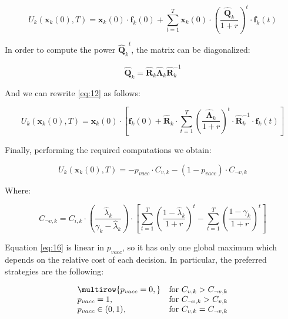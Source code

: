 \documentclass[11pt]{article}
\begin{document}
\begin{equation}\label{eq:12}
	U_k(\mathbf{x}_k(0), T)= \mathbf{x}_k(0) \cdot \mathbf{f}_k(0) + \sum_{t=1}^{T} {\mathbf{x}_k(0) \cdot \left(\frac{ \hat{\mathbf{Q}}_k}{1+r}\right)^t \cdot \mathbf{f}_k(t)}
\end{equation}

In order to compute the power \({\hat{\mathbf{Q}}_k}^t\), the matrix can be diagonalized:

\begin{equation}\label{eq:13}
	\hat{\mathbf{Q}}_k=\hat{\mathbf{R}}_{k}\hat{\mathbf{\Lambda}}_{k}\hat{\mathbf{R}}^{-1}_{k}
\end{equation}

And we can rewrite \eqref{eq:12} as follows:

\begin{equation}\label{eq:14}
	U_k(\mathbf{x}_k(0), T)= \mathbf{x}_k(0) \cdot \left[ \mathbf{f}_k(0) + \hat{\mathbf{R}}_{k} \cdot \sum_{t=1}^{T} { \left(\frac{ \hat{\mathbf{\Lambda}}_{k}}{1+r}\right)^t \cdot \hat{\mathbf{R}}^{-1}_{k} \cdot \mathbf{f}_k(t)} \right]
\end{equation}

Finally, performing the required computations we obtain: 

\begin{equation}\label{eq:15}
	U_k(\mathbf{x}_k(0), T)=-p_{vacc} \cdot C_{v,k} - (1-p_{vacc}) \cdot C_{\neg v,k}
\end{equation}

Where: 

\begin{equation}\label{eq:16}
	C_{\neg v,k}=C_{i,k} \cdot \left( \frac{\hat{\lambda}_{k}}{\gamma_{k}-\hat{\lambda}_{k}} \right) \cdot \left[\sum_{t = 1}^{T} \left(\frac{1-\hat{\lambda}_{k}}{1+r}\right)^t - \sum_{t = 1}^{T}\left(\frac{1-\gamma_k}{1+r}\right)^t\right]
\end{equation}

Equation \eqref{eq:16} is linear in \(p_{vacc}\), so it has only one global maximum which depends on the relative cost of each decision. In particular, the preferred strategies are the following:

\begin{equation}
	\begin{array}
	{@{}lr@{}}
        \multirow{p_{vacc}=0,} & \text{for }C_{v,k}>C_{\neg v,k} \\
        {p_{vacc}=1,} & \text{for }C_{\neg v,k}>C_{v,k} \\
        {p_{vacc}\in(0,1),} & \text{for }C_{v,k}=C_{\neg v,k} \\
    \end{array}
\end{equation}
\end{document}
